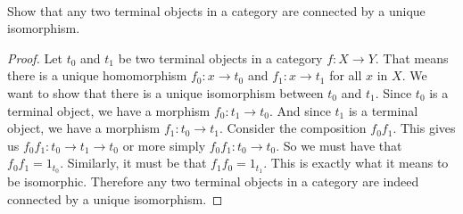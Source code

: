 \documentclass[../../main]{subfiles}
\begin{document}
\paragraph{}
\begin{exercise}
	Show that any two terminal objects in a category are connected by a unique
	isomorphism.
\end{exercise}

\begin{proof}
Let $t_0$ and $t_1$ be two terminal objects in a category $f\colon X \rightarrow Y$.
That means there is a unique homomorphism $f_0\colon x \rightarrow t_0$ and $f_1\colon x
\rightarrow t_1$ for all $x$ in $X$. We want to show that there is a unique
isomorphism between $t_0$ and $t_1$.
Since $t_0$ is a terminal object, we have a morphism $f_0\colon t_1 \rightarrow t_0$.
And since $t_1$ is a terminal object, we have a morphism $f_1\colon t_0 \rightarrow
t_1$. Consider the composition $f_0 f_1$. This gives us $f_0 f_1\colon t_0
\rightarrow t_1 \rightarrow t_0$ or more simply $f_0 f_1\colon t_0 \rightarrow t_0$.
So we must have that $f_0 f_1 = 1_{t_0}$. Similarly, it must be that $f_1 f_0 =
1_{t_1}$. This is exactly what it means to be isomorphic.
Therefore any two terminal objects in a category are indeed connected by a
unique isomorphism.
\end{proof}
\end{document}
